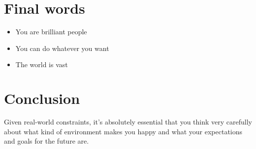\documentclass[]{beamer}
\begin{document}
\section{Final words}
\begin{frame}
\begin{itemize}
\item You are brilliant people
\item You can do whatever you want
\item The world is vast
\end{itemize}
\end{frame}

\section{Conclusion}
\begin{frame}
\centering
Given real-world constraints, it's absolutely essential that you think very carefully about what kind of environment makes you happy and what your expectations and goals for the future are.
\end{frame}
\end{document}
